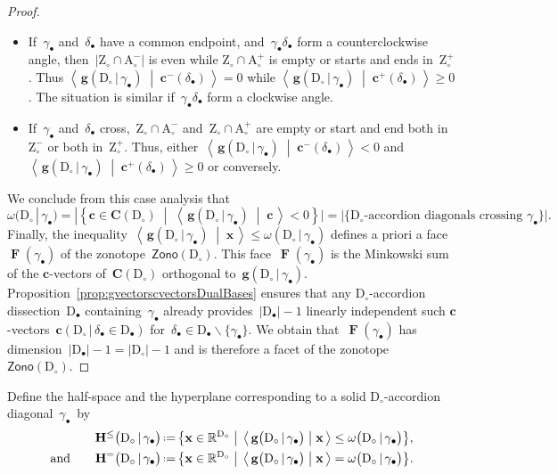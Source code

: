 \documentclass{amsart}
\theoremstyle{definition}
\newcommand{\R}{\mathbb{R}} %
\renewcommand{\b}[1]{\mathbf{#1}} %
\newcommand{\set}[2]{\left\{ #1 \;\middle|\; #2 \right\}} %
\newcommand{\bigset}[2]{\big\{ #1 \;\big|\; #2 \big\}} %
\newcommand{\ssm}{\smallsetminus} %
\newcommand{\dotprod}[2]{\left\langle \, #1 \; \middle| \; #2 \, \right\rangle} %
\newcommand{\eqdef}{\mbox{\,\raisebox{0.2ex}{\scriptsize\ensuremath{\mathrm:}}\ensuremath{=}\,}} %
\newcommand{\Zono}{\mathsf{Zono}} %
\DeclareMathOperator{\face}{\mathbf{F}} %
\newcommand{\dissection}{\mathrm{D}} %
\newcommand{\accordion}{\mathrm{A}} %
\newcommand{\zigzag}{\mathrm{Z}} %
\newcommand{\gvector}[2]{\mathbf{g}(#1 \,|\, #2)} %
\newcommand{\biggvector}[2]{\mathbf{g} \big( #1 \,|\, #2 \big)} %
\newcommand{\cvector}[3]{\mathbf{c}(#1  \,|\, #3 \in #2)} %
\newcommand{\allcvectors}[1]{\mathbf{C}(#1)} %
\newcommand{\rhs}[2]{\omega(#1 \,|\, #2)} %
\newcommand{\bigrhs}[2]{\omega \big( #1  \,|\, #2 \big)} %
\newcommand{\bigHS}[2]{\mathbf{H}^{\le} \big( #1  \,|\, #2 \big)} %
\newcommand{\bigHyp}[2]{\mathbf{H}^{=} \big( #1  \,|\, #2 \big)} %
\begin{document}
\begin{proof}
\begin{itemize}
\item If~$\gamma_\bullet$ and~$\delta_\bullet$ have a common endpoint, and~$\gamma_\bullet \delta_\bullet$ form a counterclockwise angle, then~$|{\zigzag_\circ \cap \accordion_\circ^-}|$ is even while $\zigzag_\circ \cap \accordion_\circ^+$ is empty or starts and ends in~$\zigzag_\circ^+$. Thus $\dotprod{\gvector{\dissection_\circ}{\gamma_\bullet}}{\b{c}^-(\delta_\bullet)} = 0$ while $\dotprod{\gvector{\dissection_\circ}{\gamma_\bullet}}{\b{c}^+(\delta_\bullet)} \ge 0$. The situation is similar if~$\gamma_\bullet \delta_\bullet$ form a clockwise angle.
\item If~$\gamma_\bullet$ and~$\delta_\bullet$ cross,~$\zigzag_\circ \cap \accordion_\circ^-$ and~${\zigzag_\circ \cap \accordion_\circ^+}$ are empty or start and end both in~$\zigzag_\circ^-$ or both in~$\zigzag_\circ^+$. Thus, either~$\dotprod{\gvector{\dissection_\circ}{\gamma_\bullet}}{\b{c}^-(\delta_\bullet)} < 0$ and~$\dotprod{\gvector{\dissection_\circ}{\gamma_\bullet}}{\b{c}^+(\delta_\bullet)} \ge 0$ or conversely.
\end{itemize}
We conclude from this case analysis that
\[
\rhs{\dissection_\circ}{\gamma_\bullet} = |\set{\b{c} \in \allcvectors{\dissection_\circ}}{\dotprod{\gvector{\dissection_\circ}{\gamma_\bullet}}{\b{c}} < 0}| = |\{\text{$\dissection_\circ$-accordion diagonals crossing~$\gamma_\bullet$}\}|.
\]
%
Finally, the inequality~$\dotprod{\gvector{\dissection_\circ}{\gamma_\bullet}}{\b{x}} \le \rhs{\dissection_\circ}{\gamma_\bullet}$ defines a priori a face~$\face(\gamma_\bullet)$ of the zonotope~$\Zono(\dissection_\circ)$. This face~$\face(\gamma_\bullet)$ is the Minkowski sum of the $\b{c}$-vectors of~$\allcvectors{\dissection_\circ}$ orthogonal to~$\gvector{\dissection_\circ}{\gamma_\bullet}$. Proposition~\ref{prop:gvectorscvectorsDualBases} ensures that any $\dissection_\circ$-accordion dissection~$\dissection_\bullet$ containing~$\gamma_\bullet$ already provides~$|\dissection_\bullet|-1$ linearly independent such $\b{c}$-vectors~$\cvector{\dissection_\circ}{\dissection_\bullet}{\delta_\bullet}$ for~${\delta_\bullet \in \dissection_\bullet \ssm \{\gamma_\bullet\}}$. We obtain that~$\face(\gamma_\bullet)$ has dimension~$|\dissection_\bullet|-1 = |\dissection_\circ|-1$ and is therefore a facet of the zonotope~$\Zono(\dissection_\circ)$.
\end{proof}

Define the half-space and the hyperplane corresponding to a solid $\dissection_\circ$-accordion diagonal~$\gamma_\bullet$~by
\begin{align*}
\bigHS{\dissection_\circ}{\gamma_\bullet} & \eqdef \bigset{\b{x} \in \R^{\dissection_\circ}}{\dotprod{\biggvector{\dissection_\circ}{\gamma_\bullet}}{\b{x}} \le \bigrhs{\dissection_\circ}{\gamma_\bullet}}, \\
\text{and}\qquad
\bigHyp{\dissection_\circ}{\gamma_\bullet} & \eqdef \bigset{\b{x} \in \R^{\dissection_\circ}}{\dotprod{\biggvector{\dissection_\circ}{\gamma_\bullet}}{\b{x}} = \bigrhs{\dissection_\circ}{\gamma_\bullet}}.
\end{align*}
\end{document}
